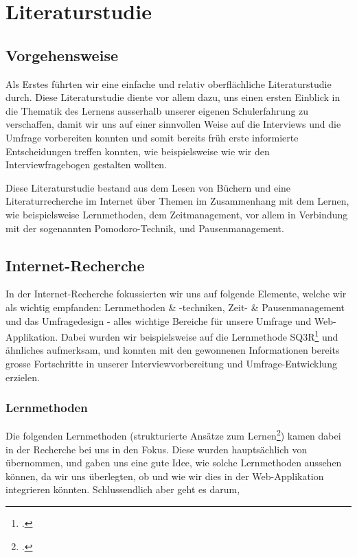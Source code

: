 \documentclass[12pt,a4paper]{report}
\begin{document}
\section{Literaturstudie}
\subsection{Vorgehensweise}
Als Erstes führten wir eine einfache und relativ oberflächliche Literaturstudie durch.
Diese Literaturstudie diente vor allem dazu, uns einen ersten Einblick in die Thematik des Lernens ausserhalb unserer eigenen Schulerfahrung zu verschaffen, damit wir uns auf einer sinnvollen Weise auf die Interviews und die Umfrage vorbereiten konnten und somit bereits früh erste informierte Entscheidungen treffen konnten, wie beispielsweise wie wir den Interviewfragebogen gestalten wollten.

Diese Literaturstudie bestand aus dem Lesen von Büchern und eine Literaturrecherche im Internet über Themen im Zusammenhang mit dem Lernen, wie beispielsweise Lernmethoden, dem Zeitmanagement, vor allem in Verbindung mit der sogenannten Pomodoro-Technik, und Pausenmanagement.


\subsection{Internet-Recherche}
In der Internet-Recherche fokussierten wir uns auf folgende Elemente, welche wir als wichtig empfanden: Lernmethoden \& -techniken, Zeit- \& Pausenmanagement und das Umfragedesign - alles wichtige Bereiche für unsere Umfrage und Web-Applikation.
Dabei wurden wir beispielsweise auf die Lernmethode SQ3R\footcite{SQ3R} und ähnliches aufmerksam, und konnten mit den gewonnenen Informationen bereits grosse Fortschritte in unserer Interviewvorbereitung und Umfrage-Entwicklung erzielen.
\subsubsection{Lernmethoden}
Die folgenden Lernmethoden (strukturierte Ansätze zum Lernen\footcite{SQ3R}) kamen dabei in der Recherche bei uns in den Fokus. 
Diese wurden hauptsächlich von \textcite{SQ3R} übernommen, und gaben uns eine gute Idee, wie solche Lernmethoden aussehen können, da wir uns überlegten, ob und wie wir dies in der Web-Applikation integrieren könnten.
Schlussendlich aber geht es darum, 
\end{document}

